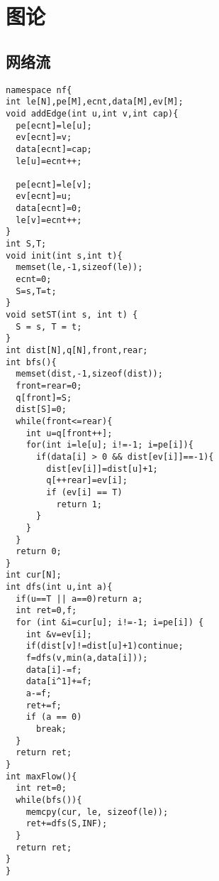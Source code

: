 \section{图论}

\subsection{网络流}
\begin{lstlisting}
namespace nf{
int le[N],pe[M],ecnt,data[M],ev[M];
void addEdge(int u,int v,int cap){
  pe[ecnt]=le[u];
  ev[ecnt]=v;
  data[ecnt]=cap;
  le[u]=ecnt++;
  
  pe[ecnt]=le[v];
  ev[ecnt]=u;
  data[ecnt]=0;
  le[v]=ecnt++;
}
int S,T;
void init(int s,int t){
  memset(le,-1,sizeof(le));
  ecnt=0;
  S=s,T=t;
}
void setST(int s, int t) {
  S = s, T = t;
}
int dist[N],q[N],front,rear;
int bfs(){
  memset(dist,-1,sizeof(dist));
  front=rear=0;
  q[front]=S;
  dist[S]=0;
  while(front<=rear){
    int u=q[front++];
    for(int i=le[u]; i!=-1; i=pe[i]){
      if(data[i] > 0 && dist[ev[i]]==-1){
        dist[ev[i]]=dist[u]+1;
        q[++rear]=ev[i];
        if (ev[i] == T)
          return 1;
      }
    }
  }
  return 0;
}
int cur[N];
int dfs(int u,int a){
  if(u==T || a==0)return a;
  int ret=0,f;
  for (int &i=cur[u]; i!=-1; i=pe[i]) {
    int &v=ev[i];
    if(dist[v]!=dist[u]+1)continue;
    f=dfs(v,min(a,data[i]));
    data[i]-=f;
    data[i^1]+=f;
    a-=f;
    ret+=f;
    if (a == 0)
      break;
  }
  return ret;
}
int maxFlow(){
  int ret=0;
  while(bfs()){
    memcpy(cur, le, sizeof(le));
    ret+=dfs(S,INF);
  }
  return ret;
}
}
\end{lstlisting}


